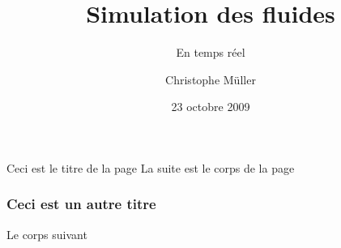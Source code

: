 \documentclass{beamer}
\title{Simulation des fluides}
\subtitle{En temps réel}
\author{Christophe Müller}
\institute{Zurich}
\date{23 octobre 2009}
\begin{document}
\begin{frame}
\titlepage
\end{frame}

\begin{frame}{Ceci est le titre de la page}
La suite est le corps de la page
\end{frame}

\begin{frame}
\frametitle{Ceci est un autre titre}
Le corps suivant

\end{frame}
\end{document}
